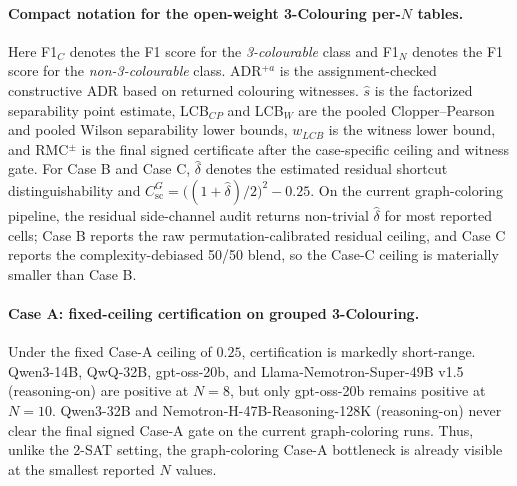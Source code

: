 \documentclass[conference]{IEEEtran}
\theoremstyle{remark}
\newcommand{\shortcutCeiling}{C_{\mathrm{sc}}^{G}}
\begin{document}
\paragraph{Compact notation for the open-weight 3-Colouring per-$N$ tables.}
Here F1$_C$ denotes the F1 score for the \emph{3-colourable} class and F1$_N$ denotes the F1 score for the \emph{non-3-colourable} class.
ADR$^{+a}$ is the assignment-checked constructive ADR based on returned colouring witnesses.
$\hat{s}$ is the factorized separability point estimate, LCB$_{CP}$ and LCB$_W$ are the pooled Clopper--Pearson and pooled Wilson separability lower bounds, $w_{LCB}$ is the witness lower bound, and RMC$^{\pm}$ is the final signed certificate after the case-specific ceiling and witness gate.
For Case B and Case C, $\hat{\delta}$ denotes the estimated residual shortcut distinguishability and $\shortcutCeiling=\bigl((1+\hat{\delta})/2\bigr)^2-0.25$.
On the current graph-coloring pipeline, the residual side-channel audit returns non-trivial $\hat{\delta}$ for most reported cells; Case B reports the raw permutation-calibrated residual ceiling, and Case C reports the complexity-debiased 50/50 blend, so the Case-C ceiling is materially smaller than Case B.

\paragraph{Case A: fixed-ceiling certification on grouped 3-Colouring.}
Under the fixed Case-A ceiling of $0.25$, certification is markedly short-range.
Qwen3-14B, QwQ-32B, gpt-oss-20b, and Llama-Nemotron-Super-49B v1.5 (reasoning-on) are positive at $N=8$, but only gpt-oss-20b remains positive at $N=10$.
Qwen3-32B and Nemotron-H-47B-Reasoning-128K (reasoning-on) never clear the final signed Case-A gate on the current graph-coloring runs.
Thus, unlike the 2-SAT setting, the graph-coloring Case-A bottleneck is already visible at the smallest reported $N$ values.
\end{document}
